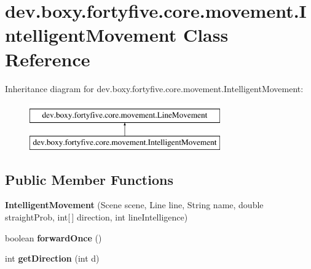 \hypertarget{classdev_1_1boxy_1_1fortyfive_1_1core_1_1movement_1_1_intelligent_movement}{
\section{dev.boxy.fortyfive.core.movement.IntelligentMovement Class Reference}
\label{d7/d04/classdev_1_1boxy_1_1fortyfive_1_1core_1_1movement_1_1_intelligent_movement}
}
Inheritance diagram for dev.boxy.fortyfive.core.movement.IntelligentMovement:\begin{figure}[H]
\begin{center}
\leavevmode
\includegraphics[height=2.000000cm]{d7/d04/classdev_1_1boxy_1_1fortyfive_1_1core_1_1movement_1_1_intelligent_movement}
\end{center}
\end{figure}
\subsection*{Public Member Functions}
\begin{DoxyCompactItemize}
\item 
\hypertarget{classdev_1_1boxy_1_1fortyfive_1_1core_1_1movement_1_1_intelligent_movement_a522369bd97278b30f3eda2d715a841eb}{
{\bfseries IntelligentMovement} (Scene scene, Line line, String name, double straightProb, int\mbox{[}$\,$\mbox{]} direction, int lineIntelligence)}
\label{d7/d04/classdev_1_1boxy_1_1fortyfive_1_1core_1_1movement_1_1_intelligent_movement_a522369bd97278b30f3eda2d715a841eb}

\item 
\hypertarget{classdev_1_1boxy_1_1fortyfive_1_1core_1_1movement_1_1_intelligent_movement_abd84efc3a250e8ac88a1f3a38bd463b2}{
boolean {\bfseries forwardOnce} ()}
\label{d7/d04/classdev_1_1boxy_1_1fortyfive_1_1core_1_1movement_1_1_intelligent_movement_abd84efc3a250e8ac88a1f3a38bd463b2}

\item 
\hypertarget{classdev_1_1boxy_1_1fortyfive_1_1core_1_1movement_1_1_intelligent_movement_a76c40a97786f8343cb9af42089121c83}{
int {\bfseries getDirection} (int d)}
\label{d7/d04/classdev_1_1boxy_1_1fortyfive_1_1core_1_1movement_1_1_intelligent_movement_a76c40a97786f8343cb9af42089121c83}

\end{DoxyCompactItemize}
